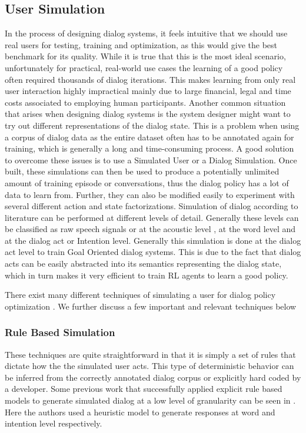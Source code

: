 \documentclass[14pt]{extarticle}
\numberwithin{equation}{section}
\begin{document}
	\subsection{User Simulation}
	In the process of designing dialog systems, it feels intuitive that we should use real users for testing, training and optimization, as this would give the best benchmark for its quality. While it is true that this is the most ideal scenario, unfortunately for practical, real-world use cases the learning of a good policy often required thousands of dialog iterations. This makes learning from only real user interaction highly impractical mainly due to large financial, legal and time costs associated to employing human participants. Another common situation that arises when designing dialog systems is the system designer might want to try out different representations of the dialog state. This is a problem when using a corpus of dialog data as the entire dataset often has to be annotated again for training, which is generally a long and time-consuming process. A good solution to overcome these issues is to use a Simulated User or a Dialog Simulation. Once built, these simulations can then be used to produce a potentially unlimited amount of training episode or conversations, thus the dialog policy has a lot of data to learn from. Further, they can also be modified easily to experiment with several different action and state factorizations.
	Simulation of dialog according to literature can be performed at different levels of detail. Generally these levels can be classified as raw speech signals or at the acoustic level \cite{lopez-cozar-simulation}, at the word level and at the dialog act or Intention level. Generally this simulation is done at the dialog act level to train Goal Oriented dialog systems. This is due to the fact that dialog acts can be easily  abstracted into its semantics representing the dialog state, which in turn makes it very efficient to train RL agents to learn a good policy. \par
	There exist many different techniques of simulating a user for dialog policy optimization \cite{Schatzmann_stat_user_sim}. We further discuss a few important and relevant techniques below
	\subsubsection{Rule Based Simulation}	
	These techniques are quite straightforward in that it is simply a set of rules that dictate how the the simulated user acts. This type of deterministic behavior can be inferred from the correctly annotated dialog corpus or explicitly hard coded by a developer. Some previous work that successfully applied explicit rule based models to generate simulated dialog at a low level of granularity can be seen in  \cite{Chung_user_sim}\cite{Lopez-Cozar_user-sim}. Here the authors used a heuristic model to generate responses at word and intention level respectively.
\end{document}
